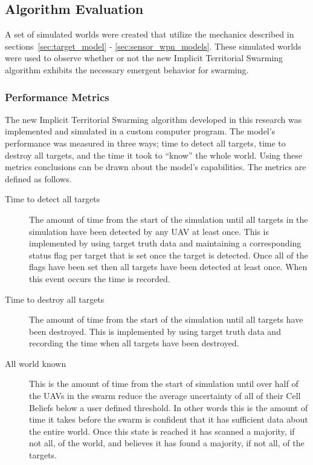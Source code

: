 \subsection{Algorithm Evaluation}
A set of simulated worlds were created that utilize the mechanics described in sections~\ref{sec:target_model} - \ref{sec:sensor_wpn_models}.  These simulated worlds were used to observe whether or not the new Implicit Territorial Swarming algorithm exhibits the necessary emergent behavior for swarming.

\subsubsection{Performance Metrics}
The new Implicit Territorial Swarming algorithm developed in this research was implemented and simulated in a custom computer program.  The model's performance was measured in three ways; time to detect all targets, time to destroy all targets, and the time it took to ``know'' the whole world.  Using these metrics conclusions can be drawn about the model's capabilities.  The metrics are defined as follows.

\begin{description}
	\item [Time to detect all targets] The amount of time from the start of the simulation until all targets in the simulation have been detected by any UAV at least once.  This is implemented by using target truth data and maintaining a corresponding status flag per target that is set once the target is detected.  Once all of the flags have been set then all targets have been detected at least once.  When this event occurs the time is recorded.
	
	\item[Time to destroy all targets] The amount of time from the start of the simulation until all targets have been destroyed.  This is implemented by using target truth data and recording the time when all targets have been destroyed.
	
	\item[All world known] This is the amount of time from the start of simulation until over half of the UAVs in the swarm reduce the average uncertainty of all of their Cell Beliefs below a user defined threshold.  In other words this is the amount of time it takes before the swarm is confident that it has sufficient data about the entire world.  Once this state is reached it has scanned a majority, if not all, of the world, and believes it has found a majority, if not all, of the targets.
\end{description}


